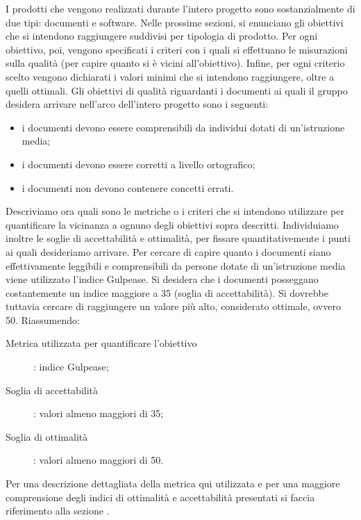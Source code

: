 		  \label{subsec:obiettiviprodotto}
			I prodotti che vengono realizzati durante l'intero progetto sono sostanzialmente di due tipi: documenti e software. Nelle prossime sezioni, si enunciano gli obiettivi che si intendono raggiungere suddivisi per tipologia di prodotto. Per ogni obiettivo, poi, vengono specificati i criteri con i quali si effettuano le misurazioni sulla qualità (per capire quanto si è vicini all'obiettivo). Infine, per ogni criterio scelto vengono dichiarati i valori minimi che si intendono raggiungere, oltre a quelli ottimali.
				Gli obiettivi di qualità riguardanti i documenti ai quali il gruppo \groupname{} desidera arrivare nell'arco dell'intero progetto sono i seguenti:
				\begin{itemize}
					\item i documenti devono essere comprensibili da individui dotati di un'istruzione media;
					\item i documenti devono essere corretti a livello ortografico;
					\item i documenti non devono contenere concetti errati.
				\end{itemize}
				Descriviamo ora quali sono le metriche o i criteri che si intendono utilizzare per quantificare la vicinanza a ognuno degli obiettivi sopra descritti. Individuiamo inoltre le soglie di accettabilità e ottimalità, per fissare quantitativemente i punti ai quali desideriamo arrivare.
					Per cercare di capire quanto i documenti siano effettivamente leggibili e comprensibili da persone dotate di un'istruzione media viene utilizzato l'indice Gulpease. Si desidera che i documenti posseggano costantemente un indice maggiore a 35 (soglia di accettabilità). Si dovrebbe tuttavia cercare di raggiungere un valore più alto, considerato ottimale, ovvero 50. Riassumendo:
					\begin{description}
						\item[Metrica utilizzata per quantificare l'obiettivo]: indice Gulpease;
						\item[Soglia di accettabilità]: valori almeno maggiori di 35;
						\item[Soglia di ottimalità]: valori almeno maggiori di 50.
					\end{description}
					Per una descrizione dettagliata della metrica qui utilizzata e per una maggiore comprensione degli indici di ottimalità e accettabilità presentati si faccia riferimento alla sezione .
